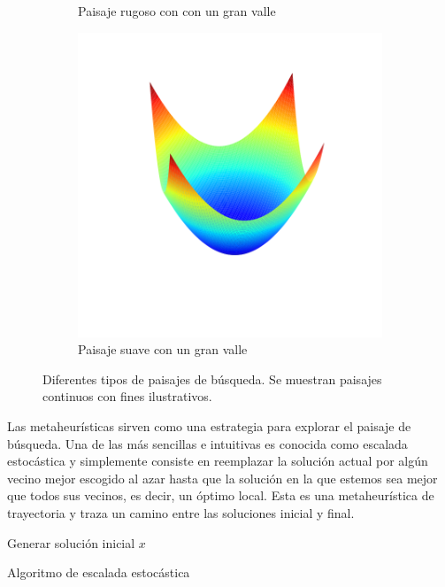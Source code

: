 \begin{figure}[H]
\begin{subfigure}{.5\textwidth}
    \caption{Paisaje rugoso con con un gran valle}
\end{subfigure}
\begin{subfigure}{\textwidth}
    \centering
    \includegraphics[scale=.4]{Imagenes/smoothvalley.png}
    \caption{Paisaje suave con un gran valle}
\end{subfigure}
\caption{Diferentes tipos de paisajes de búsqueda. Se muestran paisajes continuos con fines ilustrativos.}
\end{figure}


Las metaheurísticas sirven como una estrategia para explorar el paisaje de búsqueda. Una de las más sencillas e intuitivas es conocida como escalada estocástica y simplemente consiste en reemplazar la solución actual por algún vecino mejor escogido al azar hasta que la solución en la que estemos sea mejor que todos sus vecinos, es decir, un óptimo local. Esta es una metaheurística de trayectoria y traza un camino entre las soluciones inicial y final.

%
\begin{algorithm}[H]
 Generar solución inicial $x$\;
    \label{alg:LS}
    \caption{Algoritmo de escalada estocástica}
\end{algorithm}

